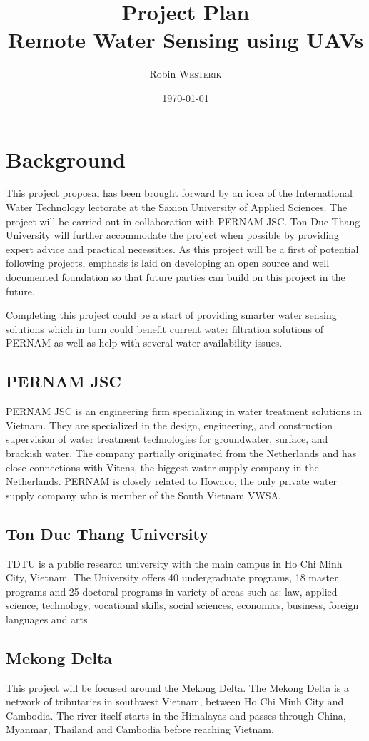 \documentclass[11pt, a4paper]{article}
\title{Project Plan\\Remote Water Sensing using UAVs}
\author{Robin \textsc{Westerik}}
\date{\today}
\begin{document}


\tableofcontents
\pagebreak

\section{Background}
This project proposal has been brought forward by an idea of the International Water Technology lectorate at the Saxion University of Applied Sciences. The project will be carried out in collaboration with PERNAM JSC. Ton Duc Thang University will further accommodate the project when possible by providing expert advice and practical necessities. As this project will be a first of potential following projects, emphasis is laid on developing an open source and well documented foundation so that future parties can build on this project in the future. 

Completing this project could be a start of providing smarter water sensing solutions which in turn could benefit current water filtration solutions of PERNAM as well as help with several water availability issues.

\subsection{PERNAM JSC}
PERNAM JSC \cite{pernam} is an engineering firm specializing in water treatment solutions in Vietnam. They are specialized in the design, engineering, and construction supervision of water treatment technologies for groundwater, surface, and brackish water. The company partially originated from the Netherlands and has close connections with Vitens, the biggest water supply company in the Netherlands. PERNAM is closely related to Howaco, the only private water supply company who is member of the South Vietnam VWSA.

\subsection{Ton Duc Thang University}
TDTU \cite{tdtu} is a public research university with the main campus in Ho Chi Minh City, Vietnam. The University offers 40 undergraduate programs, 18 master programs and 25 doctoral programs in variety of areas such as: law, applied science, technology, vocational skills, social sciences, economics, business, foreign languages and arts. 

\subsection{Mekong Delta}
This project will be focused around the Mekong Delta. The Mekong Delta is a network of tributaries in southwest Vietnam, between Ho Chi Minh City and Cambodia. The river itself starts in the Himalayas and passes through China, Myanmar, Thailand and Cambodia before reaching Vietnam.
\end{document}
